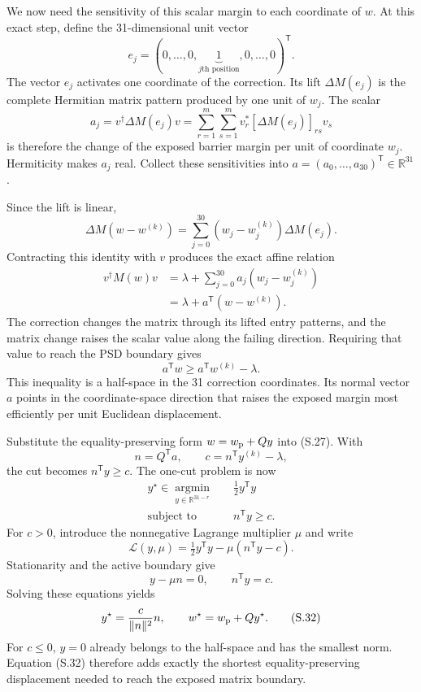 \documentclass[10pt,letterpaper,twocolumn]{article}
\newcommand{\R}{\mathbb R}
\begin{document}
We now need the sensitivity of this scalar margin to each coordinate of
\(w\).  At this exact step, define the 31-dimensional unit vector
\[
e_j=(0,\ldots,0,\underbrace{1}_{j\text{th position}},0,\ldots,0)^{\mathsf T}.
\tag{S.23}
\]
The vector \(e_j\) activates one coordinate of the correction.  Its lift
\(\Delta M(e_j)\) is the complete Hermitian matrix pattern produced by one
unit of \(w_j\).  The scalar
\[
a_j=v^\dagger\Delta M(e_j)v
=\sum_{r=1}^{m}\sum_{s=1}^{m}
v_r^*[\Delta M(e_j)]_{rs}v_s
\tag{S.24}
\]
is therefore the change of the exposed barrier margin per unit of coordinate
\(w_j\).  Hermiticity makes \(a_j\) real.  Collect these sensitivities into
\(a=(a_0,\ldots,a_{30})^{\mathsf T}\in\R^{31}\).

Since the lift is linear,
\[
\Delta M(w-w^{(k)})
=\sum_{j=0}^{30}(w_j-w_j^{(k)})\Delta M(e_j).
\tag{S.25}
\]
Contracting this identity with \(v\) produces the exact affine relation
\[
\begin{aligned}
v^\dagger M(w)v
&=\lambda+
  \sum_{j=0}^{30}a_j(w_j-w_j^{(k)})\\
&=\lambda+a^{\mathsf T}(w-w^{(k)}).
\end{aligned}
\tag{S.26}
\]
The correction changes the matrix through its lifted entry patterns, and the
matrix change raises the scalar value along the failing direction.  Requiring
that value to reach the PSD boundary gives
\[
a^{\mathsf T}w
\geq a^{\mathsf T}w^{(k)}-\lambda.
\tag{S.27}
\]
This inequality is a half-space in the 31 correction coordinates.  Its normal
vector \(a\) points in the coordinate-space direction that raises the exposed
margin most efficiently per unit Euclidean displacement.

Substitute the equality-preserving form
\(w=w_{\rm p}+Qy\) into (S.27).  With
\[
n=Q^{\mathsf T}a,
\qquad
c=n^{\mathsf T}y^{(k)}-\lambda,
\tag{S.28}
\]
the cut becomes \(n^{\mathsf T}y\geq c\).  The one-cut problem is now
\[
\begin{aligned}
y^\star\in\underset{y\in\R^{31-r}}{\operatorname{argmin}}\quad
&\frac12y^{\mathsf T}y\\
\text{subject to}\quad&n^{\mathsf T}y\geq c.
\end{aligned}
\tag{S.29}
\]
For \(c>0\), introduce the nonnegative Lagrange multiplier \(\mu\) and write
\[
\mathcal L(y,\mu)
=\tfrac12y^{\mathsf T}y-\mu(n^{\mathsf T}y-c).
\tag{S.30}
\]
Stationarity and the active boundary give
\[
y-\mu n=0,
\qquad n^{\mathsf T}y=c.
\tag{S.31}
\]
Solving these equations yields
\[
y^\star=\frac{c}{\|n\|^2}n,
\qquad
w^\star=w_{\rm p}+Qy^\star.
\tag{S.32}
\]
For \(c\leq0\), \(y=0\) already belongs to the half-space and has the
smallest norm.  Equation (S.32) therefore adds exactly the shortest
equality-preserving displacement needed to reach the exposed matrix boundary.
\end{document}
